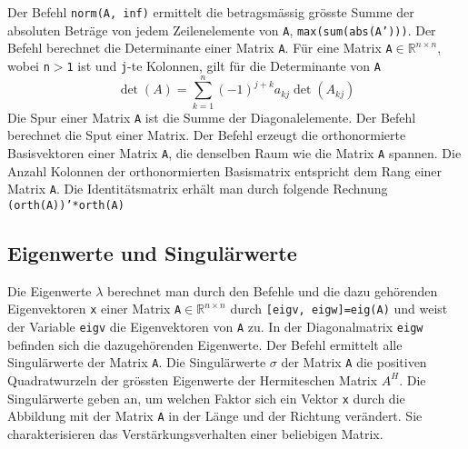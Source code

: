 Der Befehl {\color{red}\texttt{norm(A, inf)}} ermittelt die betragsmässig grösste Summe der absoluten Beträge von jedem Zeilenelemente von \texttt{A}, \texttt{max(sum(abs(A')))}.
\newline\newline
Der Befehl  berechnet die Determinante einer Matrix \texttt{A}. Für eine Matrix \texttt{A$\in\mathbb{R}^{n\times n}$}, wobei \texttt{n$>$1} ist und \texttt{j}-te Kolonnen, gilt für die Determinante von \texttt{A}
\begin{equation}
\boxed{\det(A)=\displaystyle \sum_{k=1}^n(-1)^{j+k}a_{kj}\det(A_{kj})}
\end{equation}
Die Spur einer Matrix \texttt{A} ist die Summe der Diagonalelemente. Der Befehl  berechnet die Sput einer Matrix.
\newline\newline
Der Befehl  erzeugt die orthonormierte Basisvektoren einer Matrix \texttt{A}, die denselben Raum wie die Matrix \texttt{A} spannen. Die Anzahl Kolonnen der orthonormierten Basismatrix entspricht dem Rang einer Matrix \texttt{A}. Die Identitätsmatrix erhält man durch folgende Rechnung \texttt{(orth(A))'*orth(A)}
\subsection{Eigenwerte und Singulärwerte}
Die Eigenwerte \texttt{$\lambda$} berechnet man durch den Befehle  und die dazu gehörenden Eigenvektoren \texttt{x} einer Matrix \texttt{A$\in\mathbb{R}^{n\times n}$} durch {\color{red}\texttt{[eigv, eigw]=eig(A)}} und weist der Variable \texttt{eigv} die Eigenvektoren von \texttt{A} zu. In der Diagonalmatrix \texttt{eigw} befinden sich die dazugehörenden Eigenwerte.
\newline\newline
Der Befehl  ermittelt alle Singulärwerte der Matrix \texttt{A}. Die Singulärwerte \texttt{$\sigma$} der Matrix \texttt{A} die positiven Quadratwurzeln der grössten Eigenwerte der Hermiteschen Matrix \texttt{$A^H$}. Die Singulärwerte geben an, um welchen Faktor sich ein Vektor \texttt{x} durch die Abbildung mit der Matrix \texttt{A} in der Länge und der Richtung verändert. Sie charakterisieren das Verstärkungsverhalten einer beliebigen Matrix.